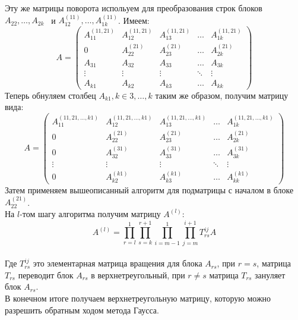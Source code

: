 \documentclass[a4paper, fontsize=14pt]{article}
\begin{document}
		Эту же матрицы поворота испольуем для преобразования строк блоков $A_{22},\dots , A_{2k}$ \, и  $A_{12}^{(11)}, \dots , A_{1k}^{(11)}$.
		Имеем:
		\begin{equation*}
			A = \left(
				\begin{array}{ccccc}
					A_{11}^{(11, 21)} & A_{12}^{(11,21)} & A_{13}^{(11,21)} & \ldots & A_{1k}^{(11,21)}\\
					0				  & A_{22}^{(21)}  	 & A_{23}^{(21)} 	& \ldots & A_{2k}^{(21)}\\
					A_{31} 		 	  & A_{32}		  & A_{33} 		  & \ldots & A_{3k}\\
					\vdots 		  	  & \vdots 		  & \vdots		  & \ddots & \vdots\\
					A_{k1} 		  	  & A_{k2}		  & A_{k3}		  & \ldots & A_{kk}
				\end{array}
			\right)
		\end{equation*}
		Теперь обнуляем столбец $A_{k1}, k \in 3,\dots,k$ таким же образом, получим матрицу вида:
		\begin{equation*}
			A = \left(
				\begin{array}{ccccc}
					A_{11}^{(11,21,\dots,k1)} & A_{12}^{(11,21,\dots,k1)} & A_{13}^{(11,21,\dots,k1)} & \ldots & A_{1k}^{(11,21,\dots,k1)}\\
					0				  		  & A_{22}^{(21)}  	 		  & A_{23}^{(21)} 			  & \ldots & A_{2k}^{(21)}\\
					0 		 	  	  		  & A_{32}^{(31)}		  	  & A_{33}^{(31)} 		  	  & \ldots & A_{3k}^{(31)}\\
					\vdots 		  	  		  & \vdots 		  			  & \vdots		 			  & \ddots & \vdots\\
					0 		  	  	  		  & A_{k2}^{(k1)}		  	  & A_{k3}^{(k1)}		  	  & \ldots & A_{kk}^{(k1)}
				\end{array}
			\right)
		\end{equation*}
		Затем применяем вышеописанный алгоритм для подматрицы с началом в блоке $A_{22}^{(21)}$.
		\\ На $l$-том шагу алгоритма получим матрицу $A^{(l)}$:
		$$A^{(l)} = \prod_{r = l}^{1}\prod_{s = k}^{r + 1}\prod_{i = m-1}^{1}\prod_{j = m}^{i+1}T_{rs}^{ij} A$$
		\\Где $T_{rs}^{ij}$ это элементарная матрица вращения для блока $A_{rs}$, при $r = s$, матрица $T_{rs}$ переводит блок $A_{rs}$ в верхнетреугольный,
		 при $r \ne s$ матрица $T_{rs}$ зануляет блок $A_{rs}$.
		 \\
		 
		 В конечном итоге получаем верхнетреугольную матрицу, которую можно разрешить обратным ходом метода Гаусса.
	 	
\end{document}
